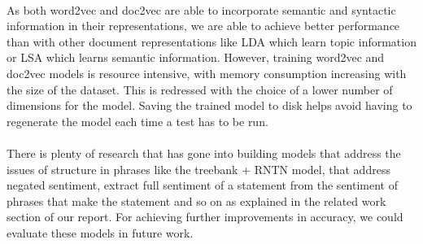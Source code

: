 \documentclass[a4paper,26pt]{article}
\begin{document}
\paragraph{}
As both word2vec and doc2vec are able to incorporate semantic and syntactic information in their representations, we are able to achieve better performance than with other document representations like LDA which learn topic information or LSA which learns semantic information. However, training word2vec and doc2vec models is resource intensive, with memory consumption increasing with the size of the dataset. This is redressed with the choice of a lower number of dimensions for the model. Saving the trained model to disk helps avoid having to regenerate the model each time a test has to be run.

\paragraph{}
There is plenty of research that has gone into building models that address the issues of structure in phrases like the treebank + RNTN model, that address negated sentiment, extract full sentiment of a statement from the sentiment of phrases that make the statement and so on as explained in the related work section of our report. For achieving further improvements in accuracy, we could evaluate these models in future work.

\printbibliography
\end{document}

